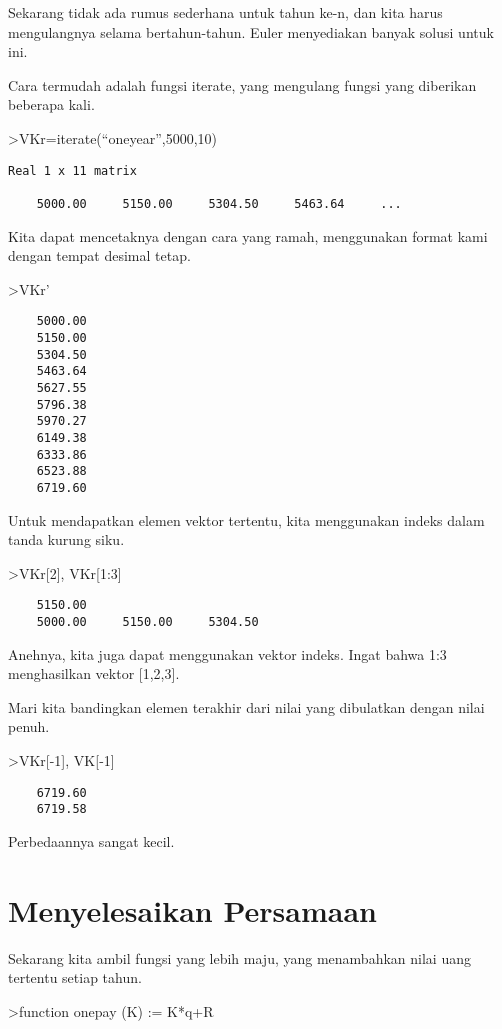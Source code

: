 \documentclass[
]{book}
\begin{document}
Sekarang tidak ada rumus sederhana untuk tahun ke-n, dan kita harus mengulangnya selama bertahun-tahun. Euler menyediakan banyak solusi untuk ini.

Cara termudah adalah fungsi iterate, yang mengulang fungsi yang diberikan beberapa kali.

\textgreater VKr=iterate(``oneyear'',5000,10)

\begin{verbatim}
Real 1 x 11 matrix

    5000.00     5150.00     5304.50     5463.64     ...
\end{verbatim}

Kita dapat mencetaknya dengan cara yang ramah, menggunakan format kami dengan tempat desimal tetap.

\textgreater VKr'

\begin{verbatim}
    5000.00 
    5150.00 
    5304.50 
    5463.64 
    5627.55 
    5796.38 
    5970.27 
    6149.38 
    6333.86 
    6523.88 
    6719.60 
\end{verbatim}

Untuk mendapatkan elemen vektor tertentu, kita menggunakan indeks dalam tanda kurung siku.

\textgreater VKr{[}2{]}, VKr{[}1:3{]}

\begin{verbatim}
    5150.00 
    5000.00     5150.00     5304.50 
\end{verbatim}

Anehnya, kita juga dapat menggunakan vektor indeks. Ingat bahwa 1:3 menghasilkan vektor {[}1,2,3{]}.

Mari kita bandingkan elemen terakhir dari nilai yang dibulatkan dengan nilai penuh.

\textgreater VKr{[}-1{]}, VK{[}-1{]}

\begin{verbatim}
    6719.60 
    6719.58 
\end{verbatim}

Perbedaannya sangat kecil.

\chapter{Menyelesaikan Persamaan}\label{menyelesaikan-persamaan}

Sekarang kita ambil fungsi yang lebih maju, yang menambahkan nilai uang tertentu setiap tahun.

\textgreater function onepay (K) := K*q+R
\end{document}
